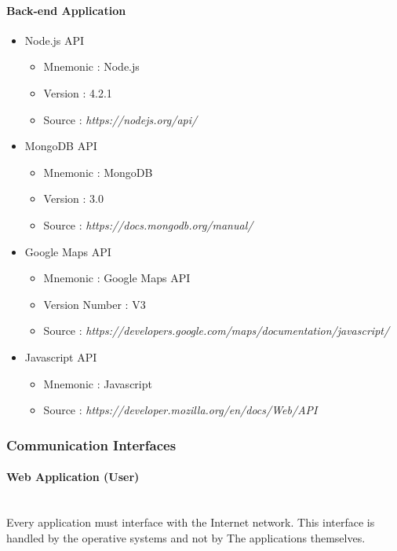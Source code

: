 \documentclass[12pt, a4paper]{article}
\begin{document}
\paragraph{Back-end Application} 

\begin{itemize}
	\item Node.js API
	\begin{itemize}
		\item Mnemonic : Node.js
		\item Version : 4.2.1
		\item Source : \emph{https://nodejs.org/api/}
	\end{itemize}

	\item MongoDB API
	\begin{itemize}
		\item Mnemonic : MongoDB
		\item Version : 3.0
		\item Source : \emph{https://docs.mongodb.org/manual/}
	\end{itemize}

	\item Google Maps API
	\begin{itemize}
		\item Mnemonic : Google Maps API
		\item Version Number : V3
		\item Source : \emph{https://developers.google.com/maps/documentation/javascript/}
	\end{itemize}
	\item Javascript API
	\begin{itemize}
		\item Mnemonic : Javascript
		\item Source : \emph{https://developer.mozilla.org/en/docs/Web/API} 
	\end{itemize}
\end{itemize}

\subsubsection{Communication Interfaces} 
\label{ssub:communication_interfaces}
\paragraph{Web Application (User)}\mbox{} \\
Every application must interface with the Internet network. This interface is handled by the operative systems and not by The applications themselves.
\end{document}
